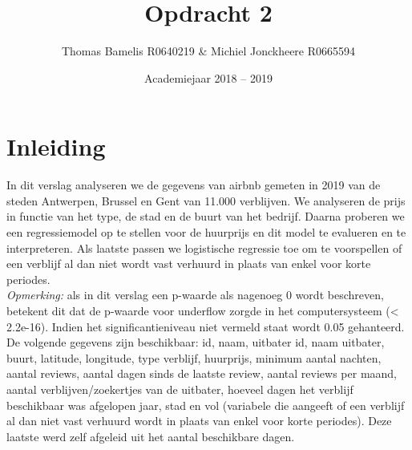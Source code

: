 \documentclass[a4paper,kulak]{kulakarticle} %
\date{Academiejaar 2018 -- 2019}
\title{Opdracht 2}
\author{Thomas Bamelis R0640219 \& Michiel Jonckheere R0665594}
\begin{document}
\maketitle

\section*{Inleiding}
In dit verslag analyseren we de gegevens van airbnb gemeten in 2019 van de steden Antwerpen, Brussel en Gent van 11.000 verblijven.
We analyseren de prijs in functie van het type, de stad en de buurt van het bedrijf.
Daarna proberen we een regressiemodel op te stellen voor de huurprijs en dit model te evalueren en te interpreteren.
Als laatste passen we logistische regressie toe om te voorspellen of een verblijf al dan niet wordt vast verhuurd in plaats van enkel voor korte periodes.\\
\textit{Opmerking:} als in dit verslag een p-waarde als nagenoeg 0 wordt beschreven, betekent dit dat de p-waarde voor underflow zorgde in het computersysteem (< 2.2e-16).
Indien het significantieniveau niet vermeld staat wordt 0.05 gehanteerd. \\
De volgende gegevens zijn beschikbaar: id, naam, uitbater id, naam uitbater, buurt, latitude, longitude, type verblijf, huurprijs, minimum aantal nachten, aantal reviews, aantal dagen sinds de laatste review, aantal reviews per maand, aantal verblijven/zoekertjes van de uitbater, hoeveel dagen het verblijf beschikbaar was afgelopen jaar, stad en vol (variabele die aangeeft of een verblijf al dan niet vast verhuurd wordt in plaats van enkel voor korte periodes).    
Deze laatste werd zelf afgeleid uit het aantal beschikbare dagen.
\end{document}
